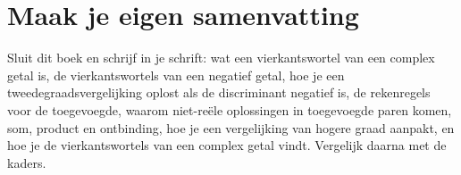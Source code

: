 

\begin{oefeningen}

\end{oefeningen}


\begin{oefeningen}







\end{oefeningen}


\ifzelfstudie
\section*{Maak je eigen samenvatting}
Sluit dit boek en schrijf in je schrift: wat een vierkantswortel van een complex getal is, de vierkantswortels van een negatief getal, hoe je een tweedegraadsvergelijking oplost als de discriminant negatief is, de rekenregels voor de toegevoegde, waarom niet-reële oplossingen in toegevoegde paren komen, som, product en ontbinding, hoe je een vergelijking van hogere graad aanpakt, en hoe je de vierkantswortels van een complex getal vindt. Vergelijk daarna met de kaders.
\fi
